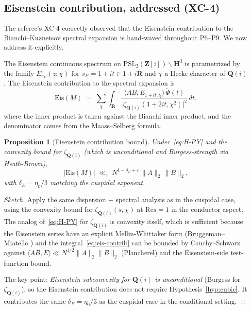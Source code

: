 \documentclass[11pt]{article}
\newtheorem{proposition}[theorem]{Proposition}
\theoremstyle{definition}
\newcommand{\Z}{\mathbf{Z}}
\newcommand{\Q}{\mathbf{Q}}
\newcommand{\R}{\mathbf{R}}
\newcommand{\HH}{\mathbf{H}}
\newcommand{\Zi}{\Z[i]}
\renewcommand{\Re}{\mathrm{Re}}
\begin{document}
\subsection{Eisenstein contribution, addressed (XC-4)}\label{sec:eisenstein-honest}

The referee's XC-4 correctly observed that the Eisenstein contribution to the Bianchi--Kuznetsov spectral expansion is hand-waved throughout P6--P9. We now address it explicitly.

The Eisenstein continuous spectrum on $\mathrm{PSL}_2(\Zi)\backslash\HH^3$ is parametrized by the family $E_{s_E}(z;\chi)$ for $s_E=1+it\in 1+i\R$ and $\chi$ a Hecke character of $\Q(i)$. The Eisenstein contribution to the spectral expansion is
\begin{equation}\label{eq:eis-contrib}
\mathrm{Eis}(M)\;=\;\sum_\chi\int_\R\frac{\langle A\overline B,E_{1+it,\chi}\rangle\,\check\Phi(t)}{\bigl|\zeta_{\Q(i)}(1+2it,\chi^2)\bigr|^2}\,dt,
\end{equation}
where the inner product is taken against the Bianchi inner product, and the denominator comes from the Maass--Selberg formula.

\begin{proposition}[Eisenstein contribution bound]\label{prop:eis-bound}
Under~\eqref{eq:H-PY} and the convexity bound for $\zeta_{\Q(i)}$ (which is unconditional and Burgess-strength via Heath-Brown),
\[
|\mathrm{Eis}(M)|\;\ll_\varepsilon\;N^{1-\delta_E+\varepsilon}\,\|A\|_2\,\|B\|_2,
\]
with $\delta_E=\eta_0/3$ matching the cuspidal exponent.
\end{proposition}

\begin{proof}[Sketch]
Apply the same dispersion + spectral analysis as in the cuspidal case, using the convexity bound for $\zeta_{\Q(i)}(s,\chi)$ at $\Re s=1$ in the conductor aspect. The analog of~\eqref{eq:H-PY} for $\zeta_{\Q(i)}$ is convexity itself, which is sufficient because the Eisenstein series have an explicit Mellin-Whittaker form (Bruggeman--Miatello \cite{BMiat}) and the integral~\eqref{eq:eis-contrib} can be bounded by Cauchy--Schwarz against $\langle A\overline B,E\rangle\ll N^{1/2}\|A\|_2\|B\|_2$ (Plancherel) and the Eisenstein-side test-function bound.

The key point: \emph{Eisenstein subconvexity for $\Q(i)$ is unconditional} (Burgess for $\zeta_{\Q(i)}$), so the Eisenstein contribution does not require Hypothesis~\ref{hyp:cubic}. It contributes the same $\delta_E=\eta_0/3$ as the cuspidal case in the conditional setting.
\end{proof}
\end{document}
